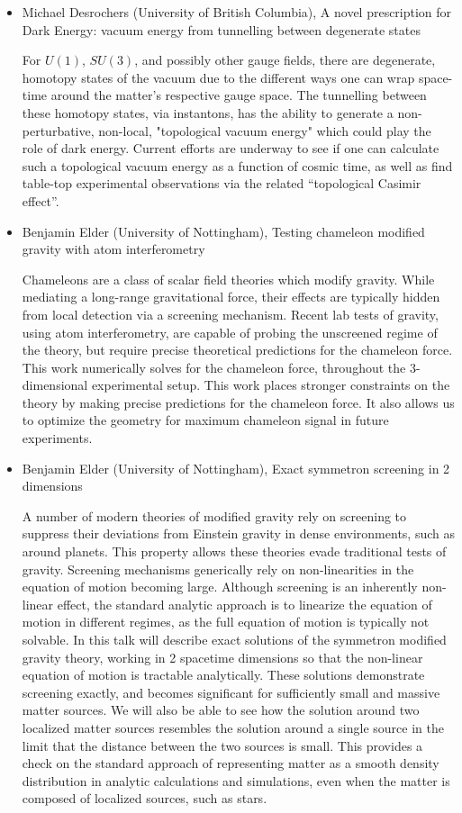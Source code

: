 \documentclass[letterpaper,12pt]{article}
\newcommand{\talk}[2]{{\fontspec{Lato Bold} #1,} {\fontspec{Lato Italic} #2}}
\begin{document}
\begin{itemize}
\item \talk{Michael Desrochers (University of British Columbia)}{A novel prescription for Dark Energy: vacuum energy from tunnelling between degenerate states}

For $U(1)$, $SU(3)$, and possibly other gauge fields, there are degenerate, homotopy states of the vacuum due to the different ways one can wrap space-time around the matter's respective gauge space. The tunnelling between these homotopy states, via instantons, has the ability to generate a non-perturbative, non-local, "topological vacuum energy" which could play the role of dark energy. Current efforts are underway to see if one can calculate such a topological vacuum energy as a function of cosmic time, as well as find table-top experimental observations via the related ``topological Casimir effect''.


\item \talk{Benjamin Elder (University of Nottingham)}{Testing chameleon modified gravity with atom interferometry}

Chameleons are a class of scalar field theories which modify gravity. While mediating a long-range gravitational force, their effects are typically hidden from local detection via a screening mechanism. Recent lab tests of gravity, using atom interferometry, are capable of probing the unscreened regime of the theory, but require precise theoretical predictions for the chameleon force. This work numerically solves for the chameleon force, throughout the 3-dimensional experimental setup. This work places stronger constraints on the theory by making precise predictions for the chameleon force. It also allows us to optimize the geometry for maximum chameleon signal in future experiments.	


\item \talk{Benjamin Elder (University of Nottingham)}{Exact symmetron screening in 2 dimensions}

A number of modern theories of modified gravity rely on screening to suppress their deviations from Einstein gravity in dense environments, such as around planets. This property allows these theories evade traditional tests of gravity. Screening mechanisms generically rely on non-linearities in the equation of motion becoming large.  Although screening is an inherently non-linear effect, the standard analytic approach is to linearize the equation of motion in different regimes, as the full equation of motion is typically not solvable. In this talk will describe exact solutions of the symmetron modified gravity theory, working in 2 spacetime dimensions so that the non-linear equation of motion is tractable analytically. These solutions demonstrate screening exactly, and becomes significant for sufficiently small and massive matter sources.  We will also be able to see how the solution around two localized matter sources resembles the solution around a single source in the limit that the distance between the two sources is small. This provides a check on the standard approach of representing matter as a smooth density distribution in analytic calculations and simulations, even when the matter is composed of localized sources, such as stars.



\end{itemize}
\end{document}

